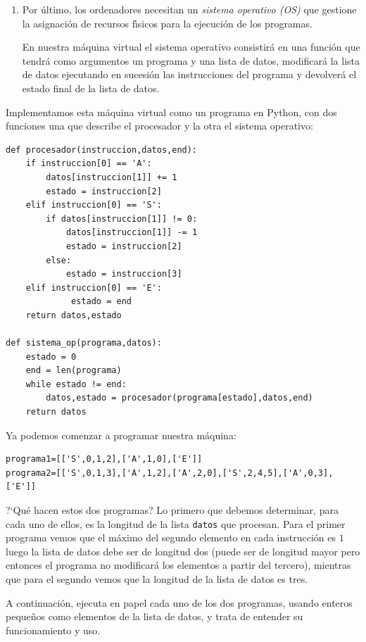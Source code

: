 \begin{appendices}
\begin{enumerate}
\begin{enumerate}
\end{enumerate}
\item Por \'ultimo, los ordenadores necesitan un {\itshape sistema operativo
(OS)} que gestione la asignaci\'on de recursos f\'{\i}sicos para la ejecuci\'on
de los programas. 

En nuestra m\'aquina virtual el sistema operativo consistir\'a en una funci\'on 
que tendr\'a como argumentos un programa y una lista de datos, modificar\'a la
lista de datos ejecutando en sucesi\'on las instrucciones del programa y
devolver\'a el estado final de la lista de datos. 

\end{enumerate}


Implementamos esta m\'aquina virtual como un programa en Python, con dos
funciones una que describe el procesador y la otra el sistema operativo:
\begin{lstlisting}[columns=spaceflexible]
 def procesador(instruccion,datos,end):
    if instruccion[0] == 'A':
        datos[instruccion[1]] += 1
        estado = instruccion[2]
    elif instruccion[0] == 'S':
        if datos[instruccion[1]] != 0:
            datos[instruccion[1]] -= 1 
            estado = instruccion[2]
        else:
            estado = instruccion[3]
    elif instruccion[0] == 'E':
             estado = end
    return datos,estado

def sistema_op(programa,datos):
    estado = 0
    end = len(programa)
    while estado != end:
        datos,estado = procesador(programa[estado],datos,end)
    return datos
\end{lstlisting}


Ya podemos comenzar a programar nuestra m\'aquina:
\begin{lstlisting}[columns=spaceflexible]
programa1=[['S',0,1,2],['A',1,0],['E']]
programa2=[['S',0,1,3],['A',1,2],['A',2,0],['S',2,4,5],['A',0,3],['E']]
\end{lstlisting}


?`Qu\'e hacen estos dos programas? Lo primero que debemos determinar, para cada
uno de ellos, es la longitud de la lista  {\tt datos} que procesan. Para el
primer programa vemos que el m\'aximo del segundo elemento en cada instrucci\'on
es $1$ luego la lista de datos debe ser de longitud dos 
(puede ser de longitud mayor pero entonces el programa no modificar\'a los
elementos a partir del tercero), mientras que para el segundo 
vemos que la longitud de la lista de datos es tres.

A continuaci\'on, ejecuta en papel cada uno de los dos programas, usando enteros
peque\~nos como elementos de la lista de datos, y trata de entender su
funcionamiento y uso.


\end{appendices}
